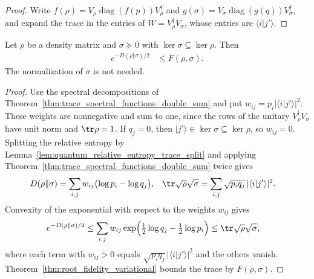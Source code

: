 \begin{proof}\leanok
    Write $f(\rho)=V_\rho\operatorname{diag}(f(p))V_\rho^\dagger$ and
    $g(\sigma)=V_\sigma\operatorname{diag}(g(q))V_\sigma^\dagger$, and
    expand the trace in the entries of $W=V_\rho^\dagger V_\sigma$, whose
    entries are $\langle i|j'\rangle$.
\end{proof}

\begin{theorem}
    \label{thm:root_fidelity_relative_entropy}
    \leanok
    Let $\rho$ be a density matrix and $\sigma\succeq0$ with
    $\ker\sigma\subseteq\ker\rho$. Then
    \begin{align}
        e^{-D(\rho\Vert\sigma)/2}
         & \le F(\rho,\sigma).
        \label{eq:root_fidelity_relative_entropy}
    \end{align}
    The normalization of $\sigma$ is not needed.
\end{theorem}

\begin{proof}\leanok
    Use the spectral decompositions of
    Theorem~\ref{thm:trace_spectral_functions_double_sum} and put
    $w_{ij}=p_i|\langle i|j'\rangle|^2$. These weights are nonnegative and
    sum to one, since the rows of the unitary $V_\rho^\dagger V_\sigma$ have
    unit norm and $\tr\rho=1$. If $q_j=0$, then $|j'\rangle\in\ker\sigma
        \subseteq\ker\rho$, so $w_{ij}=0$. Splitting the relative entropy by
    Lemma~\ref{lem:quantum_relative_entropy_trace_split} and applying
    Theorem~\ref{thm:trace_spectral_functions_double_sum} twice gives
    \begin{align}
        D(\rho\Vert\sigma)
         & =\sum_{i,j}w_{ij}\bigl(\log p_i-\log q_j\bigr),
         &
        \tr\sqrt\rho\sqrt\sigma
         & =\sum_{i,j}\sqrt{p_iq_j}\,|\langle i|j'\rangle|^2.
        \notag
    \end{align}
    Convexity of the exponential with respect to the weights $w_{ij}$
    gives
    \begin{align}
        e^{-D(\rho\Vert\sigma)/2}
         & \le\sum_{i,j}w_{ij}
        \exp\Bigl(\tfrac12\log q_j-\tfrac12\log p_i\Bigr)
        \le\tr\sqrt\rho\sqrt\sigma,
        \notag
    \end{align}
    where each term with $w_{ij}>0$ equals
    $\sqrt{p_iq_j}\,|\langle i|j'\rangle|^2$ and the others vanish.
    Theorem~\ref{thm:root_fidelity_variational} bounds the trace by
    $F(\rho,\sigma)$.
\end{proof}

